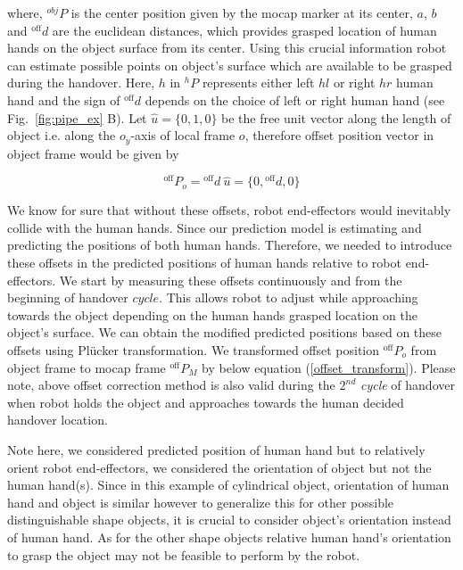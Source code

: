 where, ${}^{obj}{P}$ is the center position given by the mocap marker at its center, $a$, $b$ and ${}^\text{off}{d}$ are the euclidean distances, which provides grasped location of human hands on the object surface from its center. Using this crucial information robot can estimate possible points on object's surface which are available to be grasped during the handover. Here, $h$ in ${}^{h}{P}$ represents either left $hl$ or right $hr$ human hand and the sign of ${}^\text{off}{d}$ depends on the choice of left or right human hand (see Fig.~\ref{fig:pipe_ex} B). Let $\hat{u} = \{0, 1, 0\}$ be the free unit vector along the length of object i.e. along the $o_y$-axis of local frame $o$, therefore offset position vector in object frame would be given by

\begin{equation}
	{}^\text{off}{P}_{o} = {}^\text{off}{d} \: \hat{u}  =  \{0, {}^\text{off}{d}, 0\}
\end{equation}


We know for sure that without these offsets, robot end-effectors would inevitably collide with the human hands. Since our prediction model is estimating and predicting the positions of both human hands. Therefore, we needed to introduce these offsets in the predicted positions of human hands relative to robot end-effectors. We start by measuring these offsets continuously and from the beginning of handover $\textit{cycle}$. This allows robot to adjust while approaching towards the object depending on the human hands grasped location on the object's surface. We can obtain the modified predicted positions based on these offsets using Pl\"ucker transformation. We transformed offset position ${}^\text{off}{P}_{o}$ from object frame to mocap frame ${}^\text{off}{P}_{M}$ by below equation (\ref{offset_transform}). Please note, above offset correction method is also valid during the $2^{nd}$ \textit{cycle} of handover when robot holds the object and approaches towards the human decided handover location.


Note here, we considered predicted position of human hand but to relatively orient robot end-effectors, we considered the orientation of object but not the human hand(s). Since in this example of cylindrical object, orientation of human hand and object is similar however to generalize this for other possible distinguishable shape objects, it is crucial to consider object's orientation instead of human hand. As for the other shape objects relative human hand's orientation to grasp the object may not be feasible to perform by the robot. 


